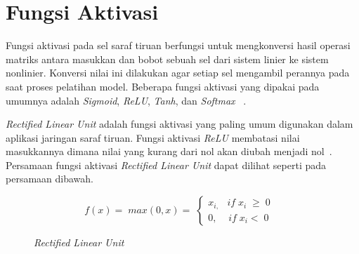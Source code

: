 \section{Fungsi Aktivasi}
\label{sec:2-FungsiAktivasi}

Fungsi aktivasi pada sel saraf tiruan berfungsi untuk mengkonversi hasil operasi matriks antara
masukkan dan bobot sebuah sel dari sistem linier ke sistem nonlinier. Konversi nilai ini dilakukan
agar setiap sel mengambil perannya pada saat proses pelatihan model. Beberapa fungsi aktivasi yang
dipakai pada umumnya adalah \textit{Sigmoid}, \textit{ReLU}, \textit{Tanh}, dan \textit{Softmax}
~\cite{2014arXiv1412.6830A}.

\textit{Rectified Linear Unit} adalah fungsi aktivasi yang paling umum digunakan dalam aplikasi
jaringan saraf tiruan. Fungsi aktivasi \textit{ReLU} membatasi nilai masukkannya dimana nilai yang
kurang dari nol akan diubah menjadi nol~\cite{Hinton_rectifiedlinear, 2018arXiv181103378N}.
Persamaan fungsi aktivasi \textit{Rectified Linear Unit} dapat dilihat seperti pada persamaan dibawah.

\begin{equation*}
    \;f(x)=\;max\left(0,x\right)=\;\left\{\begin{array}{l}x_{i,\;}\;\;if\;x_i\;\geq\;0\\0,\;\;\;\;if\;x_i<\;0\;\;\end{array}\right.\;\;
\end{equation*}

\begin{figure}[htbp]
    \begin{center}
    \end{center}
    \vspace{-20pt}
    \captionsetup{labelfont=bf, textfont=bf}
    \caption{\textit{Rectified Linear Unit}}
    \vspace{-10pt}
    \captionsetup{labelfont=md, textfont=md}
    \label{fig:relu}
\end{figure}

